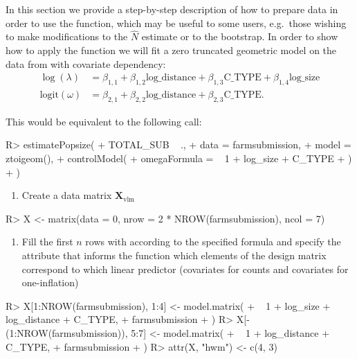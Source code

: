 \documentclass[
]{jss}
\providecommand{\tightlist}{%
  \setlength{\itemsep}{0pt}\setlength{\parskip}{0pt}}
\newcommand{\1}{\mathcal{I}} \newcommand{\bZero}{\boldsymbol{0}}
\begin{document}
In this section we provide a step-by-step description of how to prepare
data in order to use the  function, which may
be useful to some users, e.g.~those wishing to make modifications to the
\(\hat{N}\) estimate or to the bootstrap. In order to show how to apply
the function we will fit a zero truncated geometric model on the data
from \citet{chao-generalization} with covariate dependency:
\begin{align*}
  \log(\lambda) &=
  \beta_{1, 1} + \beta_{1, 2} \text{log\_distance} + \beta_{1, 3} \text{C\_TYPE} +
  \beta_{1, 4} \text{log\_size} \\
  \text{logit}(\omega) &=
  \beta_{2, 1} + \beta_{2, 2} \text{log\_distance} + \beta_{2, 3} \text{C\_TYPE}.
\end{align*}

This would be equivalent to the following  call:

\begin{CodeChunk}
\begin{CodeInput}
R> estimatePopsize(
+   TOTAL_SUB ~ .,
+   data = farmsubmission,
+   model = ztoigeom(),
+   controlModel(
+     omegaFormula = ~ 1 + log_size + C_TYPE
+   )
+ )
\end{CodeInput}
\end{CodeChunk}

\begin{enumerate}
\def\labelenumi{\arabic{enumi}.}
\tightlist
\item
  Create a data matrix \(\boldsymbol{X}_{\text{vlm}}\)
\end{enumerate}

\begin{CodeChunk}
\begin{CodeInput}
R> X <- matrix(data = 0, nrow = 2 * NROW(farmsubmission), ncol = 7)
\end{CodeInput}
\end{CodeChunk}

\begin{enumerate}
\def\labelenumi{\arabic{enumi}.}
\setcounter{enumi}{1}
\tightlist
\item
  Fill the first \(n\) rows with  according to the
  specified formula and specify the attribute  that
  informs the function which elements of the design matrix correspond to
  which linear predictor (covariates for counts and covariates for
  one-inflation)
\end{enumerate}

\begin{CodeChunk}
\begin{CodeInput}
R> X[1:NROW(farmsubmission), 1:4] <- model.matrix(
+   ~ 1 + log_size + log_distance + C_TYPE, 
+   farmsubmission
+ )
R> X[-(1:NROW(farmsubmission)), 5:7] <- model.matrix(
+   ~ 1 + log_distance + C_TYPE, 
+   farmsubmission
+ )
R> attr(X, "hwm") <- c(4, 3)
\end{CodeInput}
\end{CodeChunk}
\end{document}
